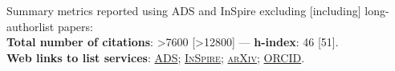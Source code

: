 Summary metrics reported using ADS and InSpire excluding [including] long-authorlist papers:
\\
\textcolor{mark_color}{\textbf{Total number of citations}}: >7600 [>12800]
 --- 
\textcolor{mark_color}{\textbf{h-index}}: 46 [51].
\\
\textcolor{mark_color}{\textbf{Web links to list services}}:
\href{https://davidegerosa.com/myads}{\textsc{ADS}};
\href{https://davidegerosa.com/myinspire}{\textsc{InSpire}};
\href{http://davidegerosa.com/myarxiv}{\textsc{arXiv}};
\href{https://davidegerosa.com/myorcid}{\textsc{ORCID}}.